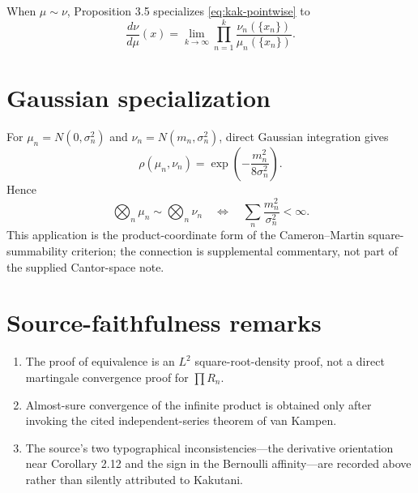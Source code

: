 When \(\mu\sim\nu\), Proposition 3.5 specializes \eqref{eq:kak-pointwise} to
\[
 \frac{d\nu}{d\mu}(x)
 =\lim_{k\to\infty}
 \prod_{n=1}^k\frac{\nu_n(\{x_n\})}{\mu_n(\{x_n\})}.
\]

\section{Gaussian specialization}
For \(\mu_n=N(0,\sigma_n^2)\) and \(\nu_n=N(m_n,\sigma_n^2)\), direct Gaussian integration gives
\[
 \rho(\mu_n,\nu_n)=
 \exp\!\left(-\frac{m_n^2}{8\sigma_n^2}\right).
\]
Hence
\[
 \bigotimes_n\mu_n\sim\bigotimes_n\nu_n
 \quad\Longleftrightarrow\quad
 \sum_n\frac{m_n^2}{\sigma_n^2}<\infty.
\]
This application is the product-coordinate form of the Cameron--Martin square-summability
criterion; the connection is supplemental commentary, not part of the supplied Cantor-space note.

\section{Source-faithfulness remarks}
\begin{enumerate}[leftmargin=2em]
\item The proof of equivalence is an \(L^2\) square-root-density proof, not a direct martingale
convergence proof for \(\prod R_n\).
\item Almost-sure convergence of the infinite product is obtained only after invoking the cited
independent-series theorem of van Kampen.
\item The source's two typographical inconsistencies---the derivative orientation near Corollary
2.12 and the sign in the Bernoulli affinity---are recorded above rather than silently attributed to
Kakutani.
\end{enumerate}



